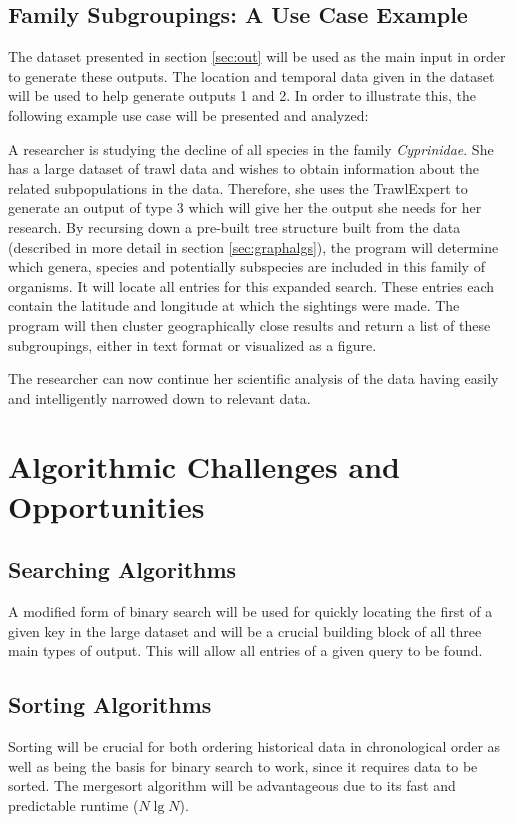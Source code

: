 \documentclass{article}
\begin{document}
\subsection{Family Subgroupings: A Use Case Example}\label{sec:case}
The dataset presented in section \ref{sec:out} will be used as the main input in order to generate these outputs. The location and temporal data given in the dataset will be used to help generate outputs 1 and 2. In order to illustrate this, the following example use case will be presented and analyzed:

A researcher is studying the decline of all species in the family \textit{Cyprinidae}. She has a large dataset of trawl data and wishes to obtain information about the related subpopulations in the data. Therefore, she uses the TrawlExpert to generate an output of type 3 which will give her the output she needs for her research. By recursing down a pre-built tree structure built from the data (described in more detail in section \ref{sec:graphalgs}), the program will determine which genera, species and potentially subspecies are included in this family of organisms. It will locate all entries for this expanded search. These entries each contain the latitude and longitude at which the sightings were made. The program will then cluster geographically close results and return a list of these subgroupings, either in text format or visualized as a figure.

The researcher can now continue her scientific analysis of the data having easily and intelligently narrowed down to relevant data.

\section{Algorithmic Challenges and Opportunities}
\subsection{Searching Algorithms}
A modified form of binary search will be used for quickly locating the first of a given key in the large dataset and will be a crucial building block of all three main types of output. This will allow all entries of a given query to be found.

\subsection{Sorting Algorithms}
Sorting will be crucial for both ordering historical data in chronological order as well as being the basis for binary search to work, since it requires data to be sorted. The mergesort algorithm will be advantageous due to its fast and predictable runtime ($N\lg N$).
\end{document}
